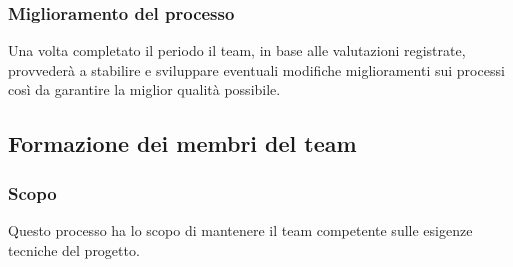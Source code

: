 \subsubsection{Miglioramento del processo}
Una volta completato il periodo il team, in base alle valutazioni registrate, provvederà a stabilire e sviluppare eventuali modifiche miglioramenti sui processi così da garantire la miglior qualità possibile.



\subsection{Formazione dei membri del team}
\subsubsection{Scopo}
Questo processo ha lo scopo di mantenere il team competente sulle esigenze tecniche del progetto.
